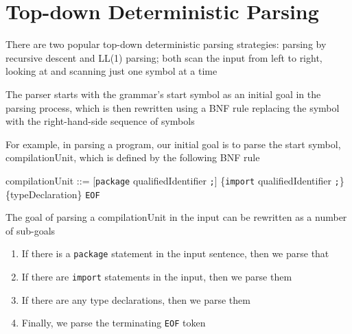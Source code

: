 \documentclass[8pt,a4paper,compress]{beamer}
\newenvironment{spaced}
{
\smallskip
\hspace{.5cm}
\begin{minipage}[c]{\textwidth}
}
{
\end{minipage}
\smallskip
}
\begin{document}
\section{Top-down Deterministic Parsing}
\begin{frame}[fragile]
\pause

There are two popular top-down deterministic parsing strategies: parsing by recursive descent and LL(1) parsing; both scan the input from left to right, looking at and scanning just one symbol at a time

\pause
\bigskip

The parser starts with the grammar's start symbol as an initial goal in the parsing process, which is then rewritten using a BNF rule replacing the symbol with the right-hand-side sequence of symbols

\pause
\bigskip

For example, in parsing a \jmm program, our initial goal is to parse the start symbol, compilationUnit, which is defined by the following BNF rule

\text{ }
\begin{spaced}
\begin{production}
compilationUnit ::= [\lstinline{package} qualifiedIdentifier \lstinline{;}]
                           \{\lstinline{import}  qualifiedIdentifier \lstinline{;}\}
                           \{typeDeclaration\} \lstinline{EOF}
\end{production}
\end{spaced}

\pause
\bigskip

The goal of parsing a compilationUnit in the input can be rewritten as a number of sub-goals

\begin{enumerate}
\item If there is a \lstinline{package} statement in the input sentence, then we parse that
\item If there are \lstinline{import} statements in the input, then we parse them
\item If there are any type declarations, then we parse them
\item Finally, we parse the terminating \lstinline{EOF} token
\end{enumerate}
\end{frame}
\end{document}
